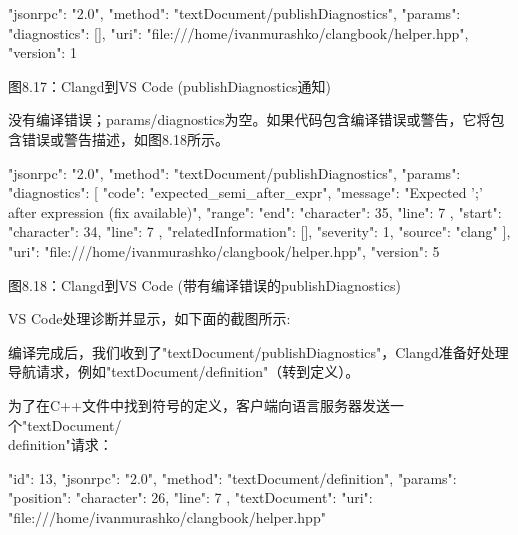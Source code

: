 \begin{shell}
{
  "jsonrpc": "2.0",
  "method": "textDocument/publishDiagnostics",
  "params": {
    "diagnostics": [],
    "uri": "file:///home/ivanmurashko/clangbook/helper.hpp",
    "version": 1
  }
}
\end{shell}

\begin{center}
图8.17：Clangd到VS Code (publishDiagnostics通知)
\end{center}

没有编译错误；params/diagnostics为空。如果代码包含编译错误或警告，它将包含错误或警告描述，如图8.18所示。

\begin{shell}
{
  "jsonrpc": "2.0",
  "method": "textDocument/publishDiagnostics",
  "params": {
    "diagnostics": [
    {
      "code": "expected_semi_after_expr",
      "message": "Expected ';' after expression (fix available)",
      "range": {
        "end": {
          "character": 35,
          "line": 7
        },
        "start": {
          "character": 34,
          "line": 7
        }
      },
      "relatedInformation": [],
      "severity": 1,
      "source": "clang"
    }
    ],
    "uri": "file:///home/ivanmurashko/clangbook/helper.hpp",
    "version": 5
  }
}
\end{shell}

\begin{center}
图8.18：Clangd到VS Code (带有编译错误的publishDiagnostics)
\end{center}

VS Code处理诊断并显示，如下面的截图所示:


编译完成后，我们收到了"textDocument/publishDiagnostics"，Clangd准备好处理导航请求，例如"textDocument/definition"（转到定义）。


为了在C++文件中找到符号的定义，客户端向语言服务器发送一个"textDocument/\\definition"请求：

\begin{shell}
{
  "id": 13,
  "jsonrpc": "2.0",
  "method": "textDocument/definition",
  "params": {
    "position": {
      "character": 26,
      "line": 7
    },
    "textDocument": {
       "uri": "file:///home/ivanmurashko/clangbook/helper.hpp"
    }
  }
}
\end{shell}

